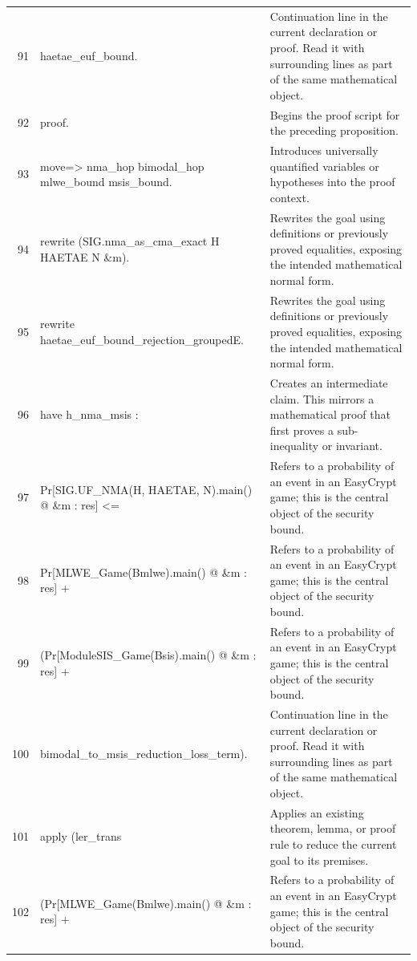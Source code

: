 \documentclass[10pt]{article}
\begin{document}
\begin{longtable}{r L{0.53\textwidth} L{0.37\textwidth}}
91 & {\ttfamily\scriptsize     haetae\_euf\_bound.} & Continuation line in the current declaration or proof.  Read it with surrounding lines as part of the same mathematical object. \\
92 & {\ttfamily\scriptsize proof.} & Begins the proof script for the preceding proposition. \\
93 & {\ttfamily\scriptsize move=> nma\_hop bimodal\_hop mlwe\_bound msis\_bound.} & Introduces universally quantified variables or hypotheses into the proof context. \\
94 & {\ttfamily\scriptsize rewrite (SIG.nma\_as\_cma\_exact H HAETAE N \&m).} & Rewrites the goal using definitions or previously proved equalities, exposing the intended mathematical normal form. \\
95 & {\ttfamily\scriptsize rewrite haetae\_euf\_bound\_rejection\_groupedE.} & Rewrites the goal using definitions or previously proved equalities, exposing the intended mathematical normal form. \\
96 & {\ttfamily\scriptsize have h\_nma\_msis :} & Creates an intermediate claim.  This mirrors a mathematical proof that first proves a sub-inequality or invariant. \\
97 & {\ttfamily\scriptsize   Pr[SIG.UF\_NMA(H, HAETAE, N).main() @ \&m : res] <=} & Refers to a probability of an event in an EasyCrypt game; this is the central object of the security bound. \\
98 & {\ttfamily\scriptsize     Pr[MLWE\_Game(Bmlwe).main() @ \&m : res] +} & Refers to a probability of an event in an EasyCrypt game; this is the central object of the security bound. \\
99 & {\ttfamily\scriptsize     (Pr[ModuleSIS\_Game(Bsis).main() @ \&m : res] +} & Refers to a probability of an event in an EasyCrypt game; this is the central object of the security bound. \\
100 & {\ttfamily\scriptsize       bimodal\_to\_msis\_reduction\_loss\_term).} & Continuation line in the current declaration or proof.  Read it with surrounding lines as part of the same mathematical object. \\
101 & {\ttfamily\scriptsize   apply (ler\_trans} & Applies an existing theorem, lemma, or proof rule to reduce the current goal to its premises. \\
102 & {\ttfamily\scriptsize     (Pr[MLWE\_Game(Bmlwe).main() @ \&m : res] +} & Refers to a probability of an event in an EasyCrypt game; this is the central object of the security bound. \\

\end{longtable}
\end{document}
